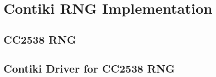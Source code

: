 \section{Contiki RNG Implementation}

\subsection{CC2538 RNG}

\subsection{Contiki Driver for CC2538 RNG}